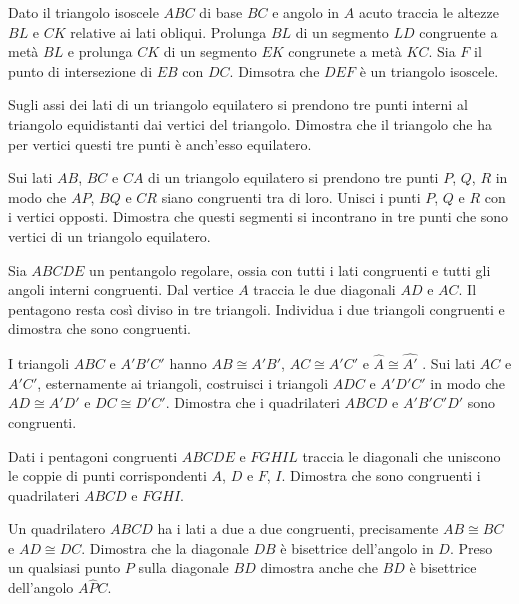 \begin{multicols}{2}
\begin{esercizio}
\label{ese:2.91}
Dato il triangolo isoscele $ABC$ di base $BC$ e angolo in $A$ acuto traccia le altezze $BL$ e $CK$ relative ai lati obliqui. Prolunga $BL$ di un segmento $LD$ congruente a metà $BL$ e prolunga $CK$ di un segmento $EK$ congrunete a metà $KC$. Sia $F$ il punto di intersezione di $EB$ con $DC$. Dimsotra che $DEF$ è un triangolo isoscele.
\end{esercizio}

\begin{esercizio}
\label{ese:2.92}
Sugli assi dei lati di un triangolo equilatero si prendono tre punti interni al triangolo equidistanti dai vertici del triangolo. Dimostra che il triangolo che ha per vertici questi tre punti è anch'esso equilatero.
\end{esercizio}

\begin{esercizio}
\label{ese:2.93}
Sui lati $AB$, $BC$ e $CA$ di un triangolo equilatero si prendono tre punti $P$, $Q$, $R$ in modo che $AP$, $BQ$ e $CR$ siano congruenti tra di loro. Unisci i punti $P$, $Q$ e $R$ con i vertici opposti. Dimostra che questi segmenti si incontrano in tre punti che sono vertici di un triangolo equilatero.
\end{esercizio}

\begin{esercizio}
\label{ese:2.94}
Sia $ABCDE$ un pentangolo regolare, ossia con tutti i lati congruenti e tutti gli angoli interni congruenti. Dal vertice $A$ traccia le due diagonali $AD$ e $AC$. Il pentagono resta così diviso in tre triangoli. Individua i due triangoli congruenti e dimostra che sono congruenti.
\end{esercizio}

\begin{esercizio}
\label{ese:2.95}
I triangoli $ABC$ e $A'B'C'$ hanno $AB\cong A'B'$, $AC\cong A'C'$ e $\widehat{A}\cong\widehat{A'}$ . Sui lati $AC$ e $A'C'$, esternamente ai triangoli, costruisci i triangoli $ADC$ e $A'D'C'$ in modo che $AD\cong A'D'$ e $DC\cong D'C'$. Dimostra che i quadrilateri $ABCD$ e $A'B'C'D'$ sono congruenti.
\end{esercizio}

\begin{esercizio}
\label{ese:2.96}
Dati i pentagoni congruenti $ABCDE$ e $FGHIL$ traccia le diagonali che uniscono le coppie di punti corrispondenti $A$, $D$ e $F$, $I$. Dimostra che sono congruenti i quadrilateri $ABCD$ e $FGHI$.
\end{esercizio}

\begin{esercizio}
\label{ese:2.97}
Un quadrilatero $ABCD$ ha i lati a due a due congruenti, precisamente $AB\cong BC$ e $AD\cong DC$. Dimostra che la diagonale $DB$ è bisettrice dell'angolo in $D$. Preso un qualsiasi punto $P$ sulla diagonale $BD$ dimostra anche che $BD$ è bisettrice dell'angolo $A\widehat{P}C$.
\end{esercizio}

\end{multicols}

